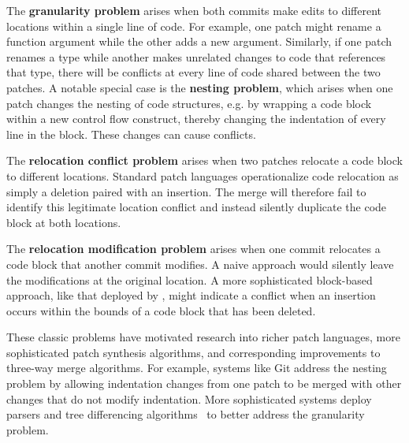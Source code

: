 The \textbf{granularity problem} 
arises when both commits make edits to different locations within a single line of code. For example, one patch might rename a function argument while the other adds a new argument. 
Similarly, if one patch renames a type while another 
makes unrelated changes to code that references that type,
there will be conflicts at every line of code shared between the two patches. 
A notable special case is the \textbf{nesting problem}, which arises when one patch changes the nesting of code structures, e.g. by wrapping a code block within a new control flow construct, thereby changing the indentation of every line in the block. These changes can cause conflicts.
 
The \textbf{relocation conflict problem} arises when two patches relocate a code block to different locations. 
Standard patch languages operationalize code relocation as simply a deletion paired with an insertion. The merge will therefore fail to identify this legitimate location conflict and instead silently duplicate the code block at both locations.

The \textbf{relocation modification problem} arises when one commit relocates a code block that another commit modifies. 
A naive approach would silently leave the modifications at the original location. A more sophisticated block-based approach, like that deployed by , might indicate a conflict when an insertion occurs within the bounds of a code block that has been deleted.

These classic problems have motivated research into richer patch languages, more sophisticated patch synthesis algorithms, and corresponding improvements to three-way merge algorithms. 
For example, systems like Git address the nesting problem by allowing indentation changes from one patch to be merged with other changes that do not modify indentation. 
More sophisticated systems deploy parsers and tree differencing algorithms~\cite{DBLP:conf/sigmod/ChawatheG97, DBLP:journals/tse/FluriWPG07,DBLP:conf/kbse/FalleriMBMM14,DBLP:conf/doceng/Lindholm04,DBLP:conf/fase/NguyenNPN10,DBLP:journals/scp/SchwagerlUW15} to better
address the granularity problem.

